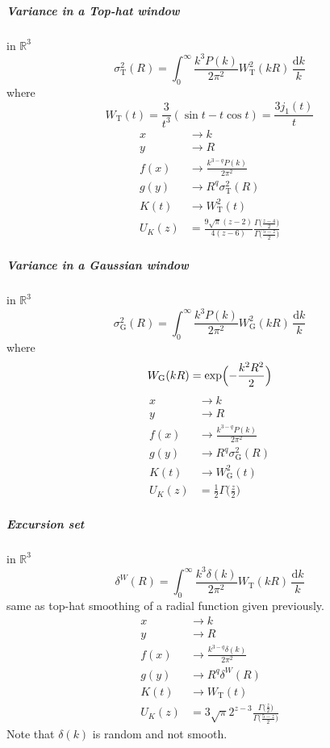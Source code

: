 \documentclass{article}
\renewcommand{\d}{\mathrm{d}}
\newcommand{\Tophat}{\textrm{T}}
\newcommand{\Gauss}{\textrm{G}}
\begin{document}
\subparagraph{Variance in a Top-hat window}
in $\mathbb{R}^3$
\begin{equation}
    \sigma_\Tophat^2(R) = \int_0^\infty \frac{k^3P(k)}{2\pi^2} W_\Tophat^2(kR) \,\frac{\d k}k
\end{equation}
where
\begin{equation}
    W_\Tophat(t) = \frac3{t^3}(\sin t - t\cos t) = \frac{3j_1(t)}t
\end{equation}
\begin{align}
    x &\to k  \\
    y &\to R  \\
    f(x) &\to \frac{k^{3-q}P(k)}{2\pi^2}  \\
    g(y) &\to R^q \sigma_\Tophat^2(R)  \\
    K(t) &\to W_\Tophat^2(t)  \\
    U_K(z) &= \frac{9\sqrt{\pi}(z-2)}{4(z-6)}
        \frac{\Gamma\bigl(\frac{z-4}2\bigr)}{\Gamma\bigl(\frac{5-z}2\bigr)}
\end{align}


\subparagraph{Variance in a Gaussian window}
in $\mathbb{R}^3$
\begin{equation}
    \sigma_\Gauss^2(R) = \int_0^\infty \frac{k^3P(k)}{2\pi^2} W_\Gauss^2(kR) \,\frac{\d k}k
\end{equation}
where
\begin{equation}
    W_\Gauss(kR) = \exp\Bigl(-\frac{k^2R^2}2\Bigr)
\end{equation}
\begin{align}
    x &\to k  \\
    y &\to R  \\
    f(x) &\to \frac{k^{3-q}P(k)}{2\pi^2}  \\
    g(y) &\to R^q \sigma_\Gauss^2(R)  \\
    K(t) &\to W_\Gauss^2(t)  \\
    U_K(z) &= \frac12 \Gamma\bigl(\frac{z}2\bigr)
\end{align}


\subparagraph{Excursion set}
in $\mathbb{R}^3$
\begin{equation}
    \delta^W(R) = \int_0^\infty \frac{k^3\delta(k)}{2\pi^2} W_\Tophat(kR) \,\frac{\d k}k
\end{equation}
same as top-hat smoothing of a radial function given previously.
\begin{align}
    x &\to k  \\
    y &\to R  \\
    f(x) &\to \frac{k^{3-q}\delta(k)}{2\pi^2}  \\
    g(y) &\to R^q \delta^W(R)  \\
    K(t) &\to W_\Tophat(t)  \\
    U_K(z) &= 3\sqrt\pi 2^{z-3}
            \frac{\Gamma\bigl(\frac{z}2\bigr)}{\Gamma\bigl(\frac{5-z}2\bigr)}
\end{align}
Note that $\delta(k)$ is random and not smooth.
\end{document}
